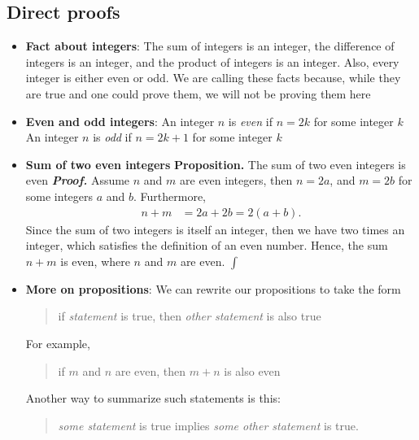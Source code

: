 \documentclass{report}
\begin{document}
    \subsection{Direct proofs}
    \begin{itemize}
        \item \textbf{Fact about integers}: The sum of integers is an integer, the difference of integers is an integer, and the product of integers is an integer. Also, every integer is either even or odd.
            \bigbreak \noindent 
            We are calling these facts because, while they are true and one could prove them, we will not be proving them here
        \item \textbf{Even and odd integers}: An integer $n$ is \textit{even} if $n=2k$ for some integer $k $
            \bigbreak \noindent 
            An integer $n$ is \textit{odd} if $n=2k+1$ for some integer $k$
        \item \textbf{Sum of two even integers}
            \bigbreak \noindent 
            \textbf{Proposition.} The sum of two even integers is even
            \bigbreak \noindent 
            \textbf{\textit{Proof.}} Assume $n$ and $m$ are even integers, then $n = 2a$, and $m = 2b$ for some integers $a$ and $b$. Furthermore,
            \begin{align*}
                n + m &= 2a + 2b = 2(a+b)
            .\end{align*}
            \bigbreak \noindent 
            Since the sum of two integers is itself an integer, then we have two times an integer, which satisfies the definition of an even number. Hence, the sum $n + m$ is even, where $n$ and $m$ are even. $\int$
        \item \textbf{More on propositions}: We can rewrite our propositions to take the form
            \begin{quote}
               if \textit{statement} is true, then \textit{other statement} is also true 
            \end{quote}
            For example, 
            \begin{quote}
               if $m$ and $n$ are even, then $m+n$ is also even
            \end{quote}
            \bigbreak \noindent 
            Another way to summarize such statements is this:
            \begin{quote}
               \textit{some statement} is true implies \textit{some other statement} is true. 
            \end{quote}

\end{itemize}
\end{document}
